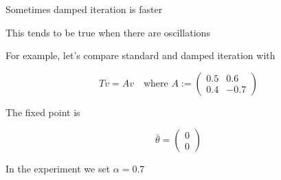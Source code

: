 \documentclass[xcolor=dvipsnames]{beamer}  %
\newcommand{\1}{\mathbbm 1}
\begin{document}
\begin{frame}
    Sometimes damped iteration is faster

    \vspace{1em}

    This tends to be true when there are oscillations

    \vspace{1em}
    \vspace{1em}
    For example, let's compare standard and damped iteration with
    \vspace{1em}

    \begin{equation*}
        Tv = Av
        \quad \text{where } A := 
        \begin{pmatrix}
            0.5 & 0.6 \\
            0.4 & -0.7
        \end{pmatrix}
    \end{equation*}

    The fixed point is 

    \begin{equation*}
        \bar \theta = 
        \begin{pmatrix}
            0 \\
            0
        \end{pmatrix}
    \end{equation*}


    In the experiment we set $\alpha = 0.7$

\end{frame}

\begin{frame}

    \begin{figure}
        \centering
    \end{figure}
    
\end{frame}
\end{document}
